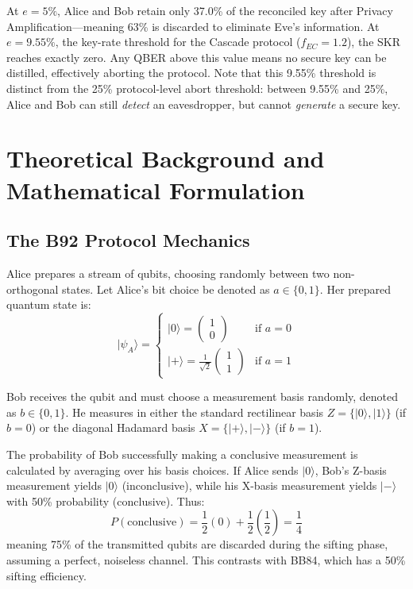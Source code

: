 \documentclass[conference]{IEEEtran}
\begin{document}
At $e=5\%$, Alice and Bob retain only 37.0\% of the reconciled key after Privacy Amplification—meaning 63\% is discarded to eliminate Eve's information. At $e=9.55\%$, the key-rate threshold for the Cascade protocol ($f_{EC}=1.2$), the SKR reaches exactly zero. Any QBER above this value means no secure key can be distilled, effectively aborting the protocol. Note that this 9.55\% threshold is distinct from the 25\% protocol-level abort threshold: between 9.55\% and 25\%, Alice and Bob can still \textit{detect} an eavesdropper, but cannot \textit{generate} a secure key.



\section{Theoretical Background and Mathematical Formulation}\label{sec2}
\subsection{The B92 Protocol Mechanics}
Alice prepares a stream of qubits, choosing randomly between two non-orthogonal states. Let Alice's bit choice be denoted as $a \in \{0, 1\}$. Her prepared quantum state is:
\begin{equation}
|\psi_A\rangle = 
\begin{cases} 
|0\rangle = \begin{pmatrix} 1 \\ 0 \end{pmatrix} & \text{if } a = 0 \\
|+\rangle = \frac{1}{\sqrt{2}}\begin{pmatrix} 1 \\ 1 \end{pmatrix} & \text{if } a = 1 
\end{cases}
\end{equation}

Bob receives the qubit and must choose a measurement basis randomly, denoted as $b \in \{0, 1\}$. He measures in either the standard rectilinear basis $Z = \{|0\rangle, |1\rangle\}$ (if $b=0$) or the diagonal Hadamard basis $X = \{|+\rangle, |-\rangle\}$ (if $b=1$). 

The probability of Bob successfully making a conclusive measurement is calculated by averaging over his basis choices. If Alice sends $|0\rangle$, Bob's Z-basis measurement yields $|0\rangle$ (inconclusive), while his X-basis measurement yields $|-\rangle$ with 50\% probability (conclusive). Thus:
\begin{equation}
P(\text{conclusive}) = \frac{1}{2} (0) + \frac{1}{2} \left(\frac{1}{2}\right) = \frac{1}{4}
\end{equation}
meaning 75\% of the transmitted qubits are discarded during the sifting phase, assuming a perfect, noiseless channel. This contrasts with BB84, which has a 50\% sifting efficiency.
\end{document}
